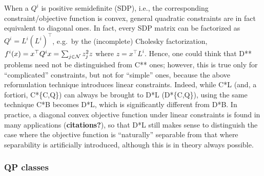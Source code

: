 When a $Q^i$ is positive semidefinite (SDP), i.e., the corresponding constraint/objective function is convex, general quadratic constraints are in fact equivalent to diagonal ones. In fact, every SDP matrix can be factorized as $Q^i = L^i (L^i)^\top$, e.g.~by the (incomplete) Cholesky factorization, $f^i(x) = x^\top Q^i x = \sum_{j \in \mathcal{N}} z^2_jz$ where $z = x^\top L^i$. Hence, one could think that D** problems need not be distinguished from C** ones; however, this is true only for ``complicated'' constraints, but not for ``simple'' ones, because the above reformulation technique introduces linear constraints. Indeed, while C*L (and, a fortiori, C*\{C,Q\}) can always be brought to D*L (D*\{C,Q\}), using the same technique C*B becomes D*L, which is significantly different from D*B. In practice, a diagonal convex objective function under linear constraints is found in many applications ({\bf citations?}), so that D*L still makes sense to distinguish the case where the objective function is ``naturally'' separable from that where separability is artificially introduced, although this is in theory always possible.

\subsubsection{QP classes}\label{ssec:classes}

